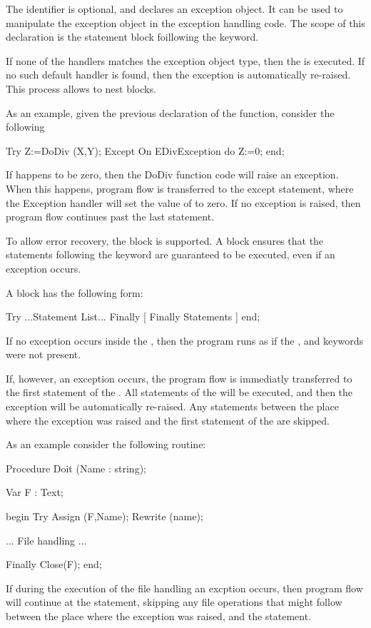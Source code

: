 \documentclass{report}
\begin{document}
The identifier  is optional, and declares an exception object. It
can be used to manipulate the exception object in the exception handling 
code. The scope of this declaration is the statement block foillowing the
 keyword.

If none of the  handlers matches the exception object type, then the
 is executed. If no such default handler is 
found, then the exception is automatically re-raised. This process allows
to nest  blocks.

As an example, given the previous declaration of the  function,
consider the following
\begin{listing}
Try
  Z:=DoDiv (X,Y);
Except
  On EDivException do Z:=0;
end;
\end{listing}
If  happens to be zero, then the DoDiv function code will raise an
exception. When this happens, program flow is transferred to the except
statement, where the Exception handler will set the value of  to
zero. If no exception is raised, then program flow continues past the last
 statement.

To allow error recovery, the  block is supported.
A  block ensures that the statements following the
 keyword are guaranteed to be executed, even if an exception
occurs.

A  block has the following form:

\begin{listing}
  Try
    ...Statement List...
  Finally
    [ Finally Statements ]
  end;
\end{listing}
If no exception occurs inside the , then the program
runs as if the ,  and  keywords were not
present.

If, however, an exception occurs, the program flow is immediatly
transferred to the first statement of the . 
All statements of the  will be executed, and then
the exception will be automatically re-raised. Any statements between the
place where the exception was raised and the first statement of the
 are skipped.

As an example consider the following routine:

\begin{listing}
Procedure Doit (Name : string);

Var F : Text;

begin
  Try
    Assign (F,Name);
    Rewrite (name);

    ... File handling ...

  Finally
    Close(F);
  end;  
\end{listing}
If during the execution of the file handling an excption occurs, then
program flow will continue at the  statement, skipping any
file operations that might follow between the place where the exception
was raised, and the  statement.
\end{document}
